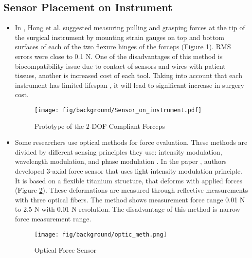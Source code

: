 \subsection{Sensor Placement on Instrument}
\begin{itemize}
\item In \cite{hong_design_2012}, Hong et al. suggested measuring pulling and grasping forces at the tip of the surgical instrument by mounting strain gauges on top and bottom surfaces of each of the two flexure hinges of the forceps (Figure \ref{fig:integr_sen}). RMS errors were close to 0.1 N. One of the disadvantages of this method is biocompatibility issue due to contact of sensors and wires with patient tissues, another is increased cost of each tool. Taking into account that each instrument has limited lifespan \cite{ho_health_2011}, it will lead to significant increase in surgery cost.

\begin{figure}[h]
	\begin{center}
	\texttt{[image: fig/background/Sensor\_on\_instrument.pdf]}
	\end{center}
	\vspace{-4mm}
	\caption[Prototype of the 2-DOF Compliant Forceps]
	{Prototype of the 2-DOF Compliant Forceps \cite{hong_design_2012}}
	\label{fig:integr_sen}
	\vspace{-2mm}
\end{figure}

\item  Some researchers use optical methods for force evaluation. These methods are divided by different sensing principles they use: intensity modulation, wavelength modulation, and phase modulation \cite{su_fiber_optic_2017}. In the paper \cite{_micro_2004}, authors developed 3-axial force sensor that uses light intensity modulation principle. It is based on a flexible titanium structure, that deforms with applied forces (Figure \ref{fig:opt_sen}). These deformations are measured through reflective measurements with three optical fibers. The method shows measurement force range 0.01 N to 2.5 N with 0.01 N resolution. The disadvantage of this method is narrow force measurement range.

\begin{figure}[h]
	\begin{center}
	\texttt{[image: fig/background/optic\_meth.png]}
	\end{center}
	\vspace{-4mm}
	\caption[Optical Force Sensor]
	{Optical Force Sensor \cite{_micro_2004}}
	\label{fig:opt_sen}
	\vspace{-2mm}
\end{figure}

\end{itemize}

